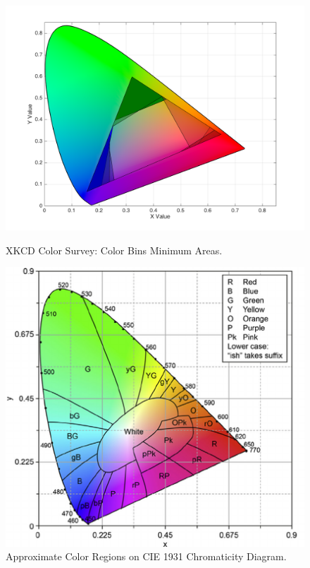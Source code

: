 \begin{figure}[!htbp]
  \vspace{-15pt}
  \centering
  \begin{minipage}{0.48\textwidth}
    \centering
    \includegraphics[width=\textwidth]{images/results/colorbins_areas.png}
    \caption[XKCD Color Survey: Color Bins Minimum Areas]{XKCD Color Survey: Color Bins Minimum Areas.}
    \label{fig:colorbins_areas}
  \end{minipage}
  \begin{minipage}{0.38\textwidth}
    \centering
    \includegraphics[width=\textwidth]{images/results/cie_colors.png}
    \caption[Approximate Color Regions on CIE 1931 Chromaticity Diagram]{Approximate Color Regions on CIE 1931 Chromaticity Diagram. \cite{Fortner1997}}
    \label{fig:cie_colorregions}
  \end{minipage}
  \vspace{-15pt}
\end{figure} \par
